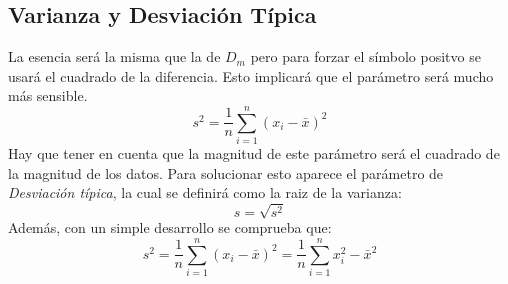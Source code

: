 \documentclass[10pt,a4paper]{book}
\begin{document}
\subsection{Varianza y Desviación Típica}
La esencia será la misma que la de $D_m$ pero para forzar el símbolo positvo se usará el cuadrado de la diferencia. Esto implicará que el parámetro será mucho más sensible.
\[s^2 = \frac1{n}\sum_{i=1}^n(x_i-\bar x)^2\]
Hay que tener en cuenta que la magnitud de este parámetro será el cuadrado de la magnitud de los datos. Para solucionar esto aparece el parámetro de \textit{Desviación típica}, la cual se definirá como la raiz de la varianza: \[s=\sqrt{s^2}\]
Además, con un simple desarrollo se comprueba que:
\[s^2 = \frac1{n}\sum_{i=1}^n(x_i-\bar x)^2 = \frac1{n}\sum_{i=1}^n x_i^2-\bar x ^2\]














		
\end{document}
